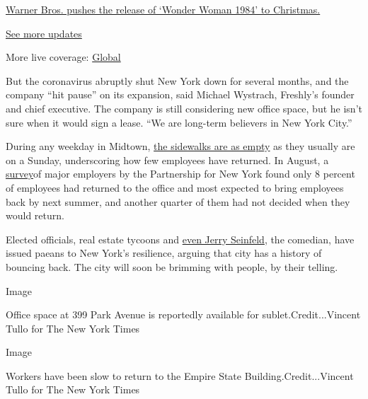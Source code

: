 \href{https://www.nytimes3xbfgragh.onion/live/2020/09/11/business/stock-market-today-coronavirus?action=click\&pgtype=Article\&state=default\&region=MAIN_CONTENT_1\&context=storylines_live_updates\#warner-bros-pushes-the-release-of-wonder-woman-1984-to-christmas}{Warner
Bros. pushes the release of `Wonder Woman 1984' to Christmas.}

\href{https://www.nytimes3xbfgragh.onion/live/2020/09/11/business/stock-market-today-coronavirus?action=click\&pgtype=Article\&state=default\&region=MAIN_CONTENT_1\&context=storylines_live_updates}{See
more updates}

More live coverage:
\href{https://www.nytimes3xbfgragh.onion/2020/09/11/world/covid-19-coronavirus.html?action=click\&pgtype=Article\&state=default\&region=MAIN_CONTENT_1\&context=storylines_live_updates}{Global}

But the coronavirus abruptly shut New York down for several months, and
the company ``hit pause'' on its expansion, said Michael Wystrach,
Freshly's founder and chief executive. The company is still considering
new office space, but he isn't sure when it would sign a lease. ``We are
long-term believers in New York City.''

During any weekday in Midtown,
\href{https://www.nytimes3xbfgragh.onion/2020/07/26/nyregion/nyc-coronavirus-time-life-building.html}{the
sidewalks are as empty} as they usually are on a Sunday, underscoring
how few employees have returned. In August, a
\href{https://pfnyc.org/news/return-to-office-survey-released-from-partnership-for-new-york-city/}{survey}of
major employers by the Partnership for New York found only 8 percent of
employees had returned to the office and most expected to bring
employees back by next summer, and another quarter of them had not
decided when they would return.

Elected officials, real estate tycoons and
\href{https://www.nytimes3xbfgragh.onion/2020/08/24/opinion/jerry-seinfeld-new-york-coronavirus.html}{even
Jerry Seinfeld}, the comedian, have issued paeans to New York's
resilience, arguing that city has a history of bouncing back. The city
will soon be brimming with people, by their telling.

Image

Office space at 399 Park Avenue is reportedly available for
sublet.Credit...Vincent Tullo for The New York Times

Image

Workers have been slow to return to the Empire State
Building.Credit...Vincent Tullo for The New York Times

